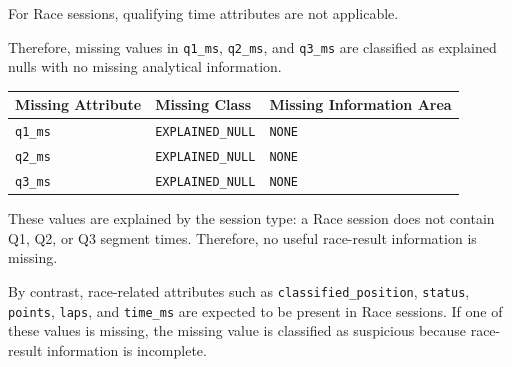 \documentclass[a4paper,11pt]{article}
\begin{document}
	For Race sessions, qualifying time attributes are not applicable.
	
	Therefore, missing values in \texttt{q1\_ms}, \texttt{q2\_ms}, and \texttt{q3\_ms}
	are classified as explained nulls with no missing analytical information.
	
	\begin{center}
		\begin{tabular}{lll}
			\toprule
			\textbf{Missing Attribute} & \textbf{Missing Class} & \textbf{Missing Information Area} \\
			\midrule
			\texttt{q1\_ms} & \texttt{EXPLAINED\_NULL} & \texttt{NONE} \\
			\texttt{q2\_ms} & \texttt{EXPLAINED\_NULL} & \texttt{NONE} \\
			\texttt{q3\_ms} & \texttt{EXPLAINED\_NULL} & \texttt{NONE} \\
			\bottomrule
		\end{tabular}
	\end{center}
	
	These values are explained by the session type: a Race session does not contain Q1,
	Q2, or Q3 segment times. Therefore, no useful race-result information is missing.
	
	By contrast, race-related attributes such as \texttt{classified\_position},
	\texttt{status}, \texttt{points}, \texttt{laps}, and \texttt{time\_ms} are expected
	to be present in Race sessions. If one of these values is missing, the missing value
	is classified as suspicious because race-result information is incomplete.
	
\end{document}

